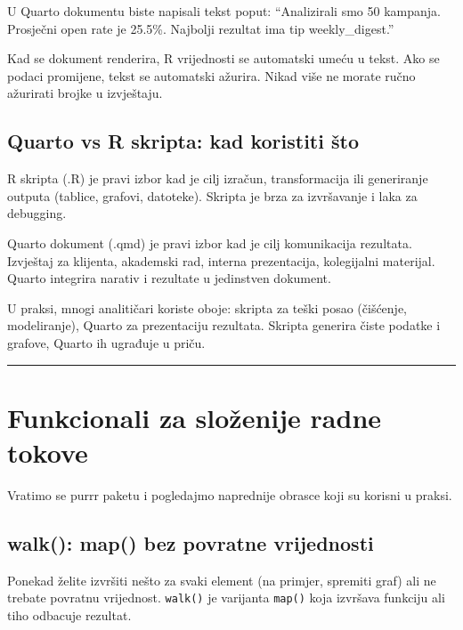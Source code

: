 \documentclass[
  croatian,
  letterpaper,
  DIV=11,
  numbers=noendperiod]{scrartcl}
\begin{document}
U Quarto dokumentu biste napisali tekst poput: ``Analizirali smo 50
kampanja. Prosječni open rate je 25.5\%. Najbolji rezultat ima tip
weekly\_digest.''

Kad se dokument renderira, R vrijednosti se automatski umeću u tekst.
Ako se podaci promijene, tekst se automatski ažurira. Nikad više ne
morate ručno ažurirati brojke u izvještaju.

\subsection{Quarto vs R skripta: kad koristiti
što}\label{quarto-vs-r-skripta-kad-koristiti-ux161to}

R skripta (.R) je pravi izbor kad je cilj izračun, transformacija ili
generiranje outputa (tablice, grafovi, datoteke). Skripta je brza za
izvršavanje i laka za debugging.

Quarto dokument (.qmd) je pravi izbor kad je cilj komunikacija
rezultata. Izvještaj za klijenta, akademski rad, interna prezentacija,
kolegijalni materijal. Quarto integrira narativ i rezultate u jedinstven
dokument.

U praksi, mnogi analitičari koriste oboje: skripta za teški posao
(čišćenje, modeliranje), Quarto za prezentaciju rezultata. Skripta
generira čiste podatke i grafove, Quarto ih ugrađuje u priču.

\begin{center}\rule{0.5\linewidth}{0.5pt}\end{center}

\section{Funkcionali za složenije radne tokove}\label{sec-funkcionali}

Vratimo se purrr paketu i pogledajmo naprednije obrasce koji su korisni
u praksi.

\subsection{walk(): map() bez povratne
vrijednosti}\label{walk-map-bez-povratne-vrijednosti}

Ponekad želite izvršiti nešto za svaki element (na primjer, spremiti
graf) ali ne trebate povratnu vrijednost. \texttt{walk()} je varijanta
\texttt{map()} koja izvršava funkciju ali tiho odbacuje rezultat.
\end{document}
